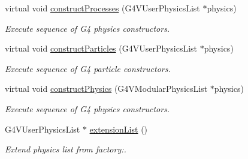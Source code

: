\begin{DoxyCompactItemize}
virtual void \hyperlink{class_d_d4hep_1_1_simulation_1_1_geant4_physics_list_action_sequence_a752ad9266718451f2a6b4906a395cbb7}{constructProcesses} (G4VUserPhysicsList $\ast$physics)
\begin{DoxyCompactList}\small\item\em Execute sequence of G4 physics constructors. \item\end{DoxyCompactList}\item 
virtual void \hyperlink{class_d_d4hep_1_1_simulation_1_1_geant4_physics_list_action_sequence_a4061788d8d84ae4bad79f7f8e53ec14b}{constructParticles} (G4VUserPhysicsList $\ast$physics)
\begin{DoxyCompactList}\small\item\em Execute sequence of G4 particle constructors. \item\end{DoxyCompactList}\item 
virtual void \hyperlink{class_d_d4hep_1_1_simulation_1_1_geant4_physics_list_action_sequence_a6f06380a0f50652f86d496ec5ab46005}{constructPhysics} (G4VModularPhysicsList $\ast$physics)
\begin{DoxyCompactList}\small\item\em Execute sequence of G4 physics constructors. \item\end{DoxyCompactList}\item 
G4VUserPhysicsList $\ast$ \hyperlink{class_d_d4hep_1_1_simulation_1_1_geant4_physics_list_action_sequence_a51078548bbd59fa3cb1447d2b2c6e2fb}{extensionList} ()
\begin{DoxyCompactList}\small\item\em Extend physics list from factory:. \item\end{DoxyCompactList}\end{DoxyCompactItemize}
